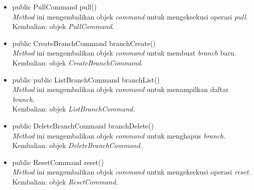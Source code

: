 \begin{itemize}
\item public PullCommand pull()\\
\textit{Method} ini mengembalikan objek \textit{command} untuk mengeksekusi operasi \textit{pull}.\\
Kembalian: objek \textit{PullCommand}.

\item public CreateBranchCommand branchCreate()\\
\textit{Method} ini mengembalikan objek \textit{command} untuk membuat \textit{branch} baru.\\
Kembalian: objek \textit{CreateBranchCommand}.

\item public public ListBranchCommand branchList()\\
\textit{Method} ini mengembalikan objek \textit{command} untuk menampilkan daftar \textit{branch}.\\
Kembalian: objek \textit{ListBranchCommand}.

\item public DeleteBranchCommand branchDelete()\\
\textit{Method} ini mengembalikan objek \textit{command} untuk menghapus \textit{branch}.\\
Kembalian: objek \textit{DeleteBranchCommand}.

\item public ResetCommand reset()\\
\textit{Method} ini mengembalikan objek \textit{command} untuk mengeksekusi operasi \textit{reset}.\\
Kembalian: objek \textit{ResetCommand}.
\end{itemize}


